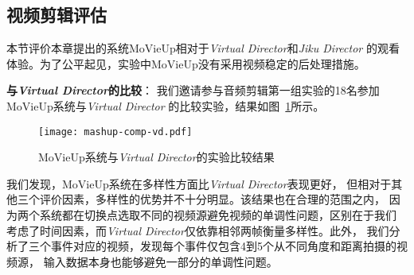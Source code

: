 \subsection{视频剪辑评估}
本节评价本章提出的系统MoVieUp相对于\emph{Virtual Director}和\emph{Jiku Director}
的观看体验。为了公平起见，实验中MoVieUp没有采用视频稳定的后处理措施。

\textbf{与\emph{Virtual Director}的比较}：
我们邀请参与音频剪辑第一组实验的18名参加MoVieUp系统与\emph{Virtual Director}
的比较实验，结果如图~\ref{fig:mashup-comp-vd}所示。
\begin{figure}[ht]
    \centering
    \texttt{[image: mashup-comp-vd.pdf]}
    \caption{MoVieUp系统与\emph{Virtual Director}的实验比较结果}
    \label{fig:mashup-comp-vd}
\end{figure}

我们发现，MoVieUp系统在多样性方面比\emph{Virtual Director}表现更好，
但相对于其他三个评价因素，多样性的优势并不十分明显。该结果也在合理的范围之内，
因为两个系统都在切换点选取不同的视频源避免视频的单调性问题，区别在于我们
考虑了时间因素，而\emph{Virtual Director}仅依靠相邻两帧衡量多样性。此外，
我们分析了三个事件对应的视频，发现每个事件仅包含4到5个从不同角度和距离拍摄的视频源，
输入数据本身也能够避免一部分的单调性问题。

